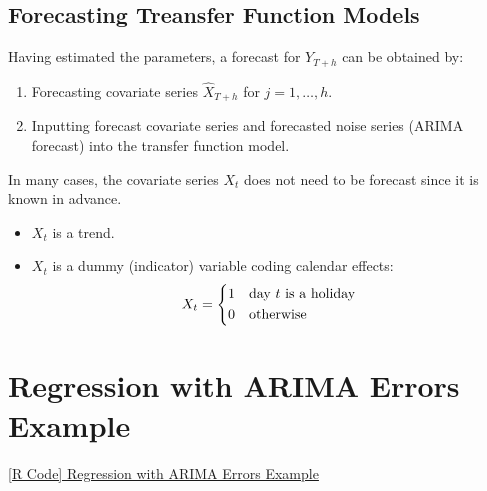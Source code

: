 \subsection*{Forecasting Treansfer Function Models}
Having estimated the parameters, a forecast for $ Y_{T+h} $ can be obtained by:
\begin{enumerate}[(1)]
    \item Forecasting covariate series $ \hat{X}_{T+h} $ for $ j=1,\ldots,h $.
    \item Inputting forecast covariate series and forecasted noise series (ARIMA forecast)
          into the transfer function model.
\end{enumerate}
\begin{Remark}{}{}
    In many cases, the covariate series $ X_t $ does not need to be forecast since it is known in advance.
    \begin{Example}{}{}
        \begin{itemize}
            \item $ X_t $ is a trend.
            \item $ X_t $ is a dummy (indicator) variable coding calendar effects:
                  \[ X_t=\begin{cases*}
                          1 & day $ t $ is a holiday \\
                          0 & otherwise
                      \end{cases*} \]

        \end{itemize}
    \end{Example}
\end{Remark}

\section{Regression with ARIMA Errors Example}
\href{https://github.com/Hextical/university-notes/blob/master/year-3/semester-2/STAT%20443/code/12.3%20-%20Regression%20with%20ARIMA%20Errors%20Example.R}{[R Code] Regression with ARIMA Errors Example}


